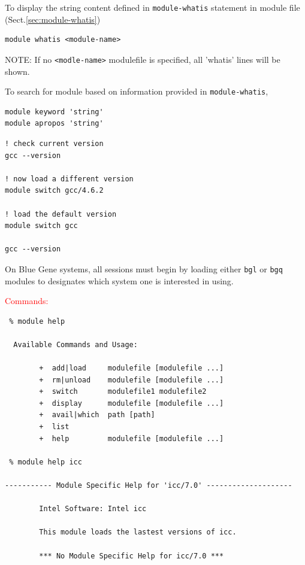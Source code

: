 To display the string content defined in \verb!module-whatis! statement in
module file (Sect.\ref{sec:module-whatis})
\begin{verbatim}
module whatis <module-name>
\end{verbatim}
NOTE:  If no \verb!<modle-name>! modulefile is specified, all 'whatis' lines
will be shown.

To search for module based on information provided in \verb!module-whatis!,
\begin{verbatim}
module keyword 'string'
module apropos 'string'
\end{verbatim}


\begin{verbatim}
! check current version
gcc --version

! now load a different version
module switch gcc/4.6.2

! load the default version
module switch gcc

gcc --version
\end{verbatim}



\begin{framed}
On Blue Gene systems, all sessions must begin by loading either \verb!bgl! or
\verb!bgq! modules to designates which system one is interested in using.
\end{framed}

\textcolor{red}{Commands:}
\begin{verbatim}
 % module help

  Available Commands and Usage:

        +  add|load     modulefile [modulefile ...]
        +  rm|unload    modulefile [modulefile ...]
        +  switch       modulefile1 modulefile2
        +  display      modulefile [modulefile ...]
        +  avail|which  path [path]
        +  list
        +  help         modulefile [modulefile ...]
        
 % module help icc

----------- Module Specific Help for 'icc/7.0' --------------------

        Intel Software: Intel icc

        This module loads the lastest versions of icc.

        *** No Module Specific Help for icc/7.0 ***       
\end{verbatim}

